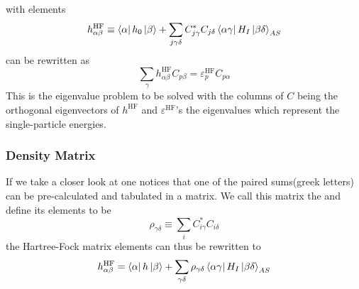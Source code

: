        with elements
            \begin{equation}
                h^{\text{HF}}_{\alpha\beta} \equiv \bra{\alpha}h_0\ket{\beta} +
                \sum_{j\gamma\delta} C^{*}_{j\gamma}C_{j\delta}
                \bra{\alpha\gamma}H_I\ket{\beta\delta}_{AS}
                \label{eq:HFmatrix}
            \end{equation}
         can be rewritten as
            \begin{equation}
                \sum_{\gamma} h^{\text{HF}}_{\alpha\beta}C_{p\beta} =
                \varepsilon^{\text{HF}}_pC_{p\alpha}
                \label{eq:HFeqFin}
            \end{equation}
        This is the eigenvalue problem to be solved with the columns of $C$
        being the orthogonal eigenvectors of $h^{\text{HF}}$ and
        $\varepsilon^{\text{HF}}$'s the eigenvalues which represent the
        single-particle energies.

    \subsubsection{Density Matrix}
        If we take a closer look at  one notices that one of
        the paired sums(greek letters) can be pre-calculated and tabulated in a
        matrix. We call this matrix the  and define its
        elements to be
            \begin{equation}
                \rho_{\gamma\delta} \equiv \sum_i C^{*}_{i\gamma}C_{i\delta}
                \label{eq:densityMatrix}
            \end{equation}
        the Hartree-Fock matrix elements can thus be rewritten to
            \begin{equation}
                h^{\text{HF}}_{\alpha\beta} = \bra{\alpha}h\ket{\beta}
                + \sum_{\gamma\delta} \rho_{\gamma\delta}
                \bra{\alpha\gamma}H_I\ket{\beta\delta}_{AS}
                \label{eq:rhoHFmatrix}
            \end{equation}

